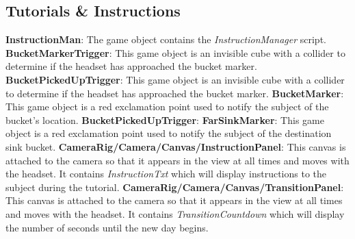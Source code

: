 \documentclass{article}
\begin{document}
\subsection{Tutorials \& Instructions} %
\textbf{InstructionMan}: The game object contains the \textit{InstructionManager} script.\newline \newline
\textbf{BucketMarkerTrigger}: This game object is an invisible cube with a collider to determine if the headset has approached the bucket marker.\newline \newline
\textbf{BucketPickedUpTrigger}: This game object is an invisible cube with a collider to determine if the headset has approached the bucket marker.\newline \newline
\textbf{BucketMarker}: This game object is a red exclamation point used to notify the subject of the bucket's location.\newline \newline
\textbf{BucketPickedUpTrigger}: %
\textbf{FarSinkMarker}: This game object is a red exclamation point used to notify the subject of the destination sink bucket.\newline \newline
\textbf{CameraRig/Camera/Canvas/InstructionPanel}: This canvas is attached to the camera so that it appears in the view at all times and moves with the headset. It contains \textit{InstructionTxt} which will display instructions to the subject during the tutorial. \newline \newline
\textbf{CameraRig/Camera/Canvas/TransitionPanel}: This canvas is attached to the camera so that it appears in the view at all times and moves with the headset. It contains \textit{TransitionCountdown} which will display the number of seconds until the new day begins. \newline \newline
\end{document}
